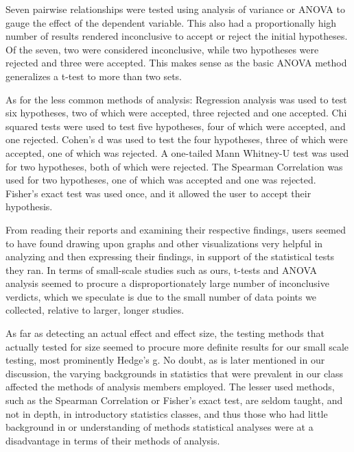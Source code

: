 Seven pairwise relationships were tested using analysis of variance or ANOVA to gauge the effect of the dependent variable. This also had a proportionally high number of results rendered inconclusive to accept or reject the initial hypotheses. Of the seven, two were considered inconclusive, while two hypotheses were rejected and three were accepted. This makes sense as the basic ANOVA method generalizes a t-test to more than two sets.

As for the less common methods of analysis:
Regression analysis was used to test six hypotheses, two of which were accepted, three rejected and one accepted. 
Chi squared tests were used to test five hypotheses, four of which were accepted, and one rejected.
Cohen’s d was used to test the four hypotheses, three of which were accepted, one of which was rejected. 
A one-tailed Mann Whitney-U test was used for two hypotheses, both of which were rejected.
The Spearman Correlation was used for two hypotheses, one of which was accepted and one was rejected. 
Fisher’s exact test was used once, and it allowed the user to accept their hypothesis. 

From reading their reports and examining their respective findings, users seemed to have found drawing upon graphs and other visualizations very helpful in analyzing and then expressing their findings, in support of the statistical tests they ran.  In terms of small-scale studies such as ours, t-tests and ANOVA analysis seemed to procure a disproportionately large number of inconclusive verdicts, which we speculate is due to the small number of data points we collected, relative to larger, longer studies.

As far as detecting an actual effect and effect size, the testing methods that actually tested for size seemed to procure more definite results for our small scale testing, most prominently Hedge’s g. No doubt, as is later mentioned in our discussion, the varying backgrounds in statistics that were prevalent in our class affected the methods of analysis members employed.  The lesser used methods, such as the Spearman Correlation or Fisher’s exact test, are seldom taught, and not in depth, in introductory statistics classes, and thus those who had little background in or understanding of methods statistical analyses were at a disadvantage in terms of their methods of analysis. 
